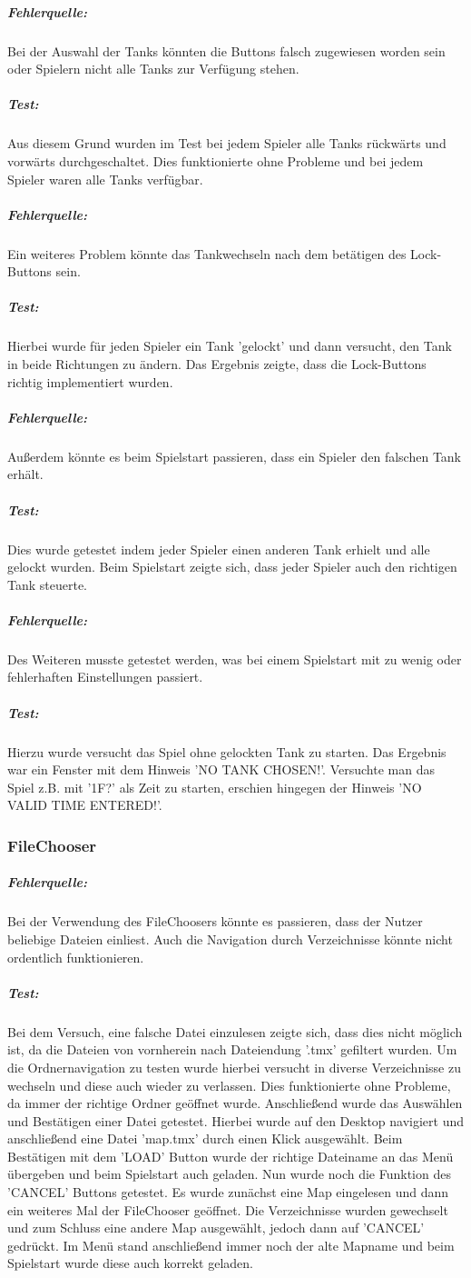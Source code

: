 \documentclass[a4paper]{scrreprt}
\begin{document}
\subparagraph*{Fehlerquelle:}
Bei der Auswahl der Tanks könnten die Buttons falsch zugewiesen worden sein oder Spielern nicht alle Tanks zur Verfügung stehen.
\subparagraph*{Test:}
Aus diesem Grund wurden im Test bei jedem Spieler alle Tanks rückwärts und vorwärts durchgeschaltet. Dies funktionierte ohne Probleme und bei jedem Spieler waren alle Tanks verfügbar. 

\subparagraph*{Fehlerquelle:}
Ein weiteres Problem könnte das Tankwechseln nach dem betätigen des Lock-Buttons sein. 
\subparagraph*{Test:}
Hierbei wurde für jeden Spieler ein Tank 'gelockt' und dann versucht, den Tank in beide Richtungen zu ändern. Das Ergebnis zeigte, dass die Lock-Buttons richtig implementiert wurden.

\subparagraph*{Fehlerquelle:}
Außerdem könnte es beim Spielstart passieren, dass ein Spieler den falschen Tank erhält. 
\subparagraph*{Test:}
Dies wurde getestet indem jeder Spieler einen anderen Tank erhielt und alle gelockt wurden. Beim Spielstart zeigte sich, dass jeder Spieler auch den richtigen Tank steuerte.
		
\subparagraph*{Fehlerquelle:}
Des Weiteren musste getestet werden, was bei einem Spielstart mit zu wenig oder fehlerhaften Einstellungen passiert. 
\subparagraph*{Test:}
Hierzu wurde versucht das Spiel ohne gelockten Tank zu starten. Das Ergebnis war ein Fenster mit dem Hinweis 'NO TANK CHOSEN!'. Versuchte man das Spiel z.B. mit '1F?' als Zeit zu starten, erschien hingegen der Hinweis 'NO VALID TIME ENTERED!'. 

\subsubsection*{FileChooser}
\subparagraph*{Fehlerquelle:}
Bei der Verwendung des FileChoosers könnte es passieren, dass der Nutzer beliebige Dateien einliest. Auch die Navigation durch Verzeichnisse könnte nicht ordentlich funktionieren. 
\subparagraph*{Test:}
Bei dem Versuch, eine falsche Datei einzulesen zeigte sich, dass dies nicht möglich ist, da die Dateien von vornherein nach Dateiendung '.tmx' gefiltert wurden. Um die Ordnernavigation zu testen wurde hierbei versucht in diverse Verzeichnisse zu wechseln und diese auch wieder zu verlassen. Dies funktionierte ohne Probleme, da immer der richtige Ordner geöffnet wurde. Anschließend wurde das Auswählen und Bestätigen einer Datei getestet. Hierbei wurde auf den Desktop navigiert und anschließend eine Datei 'map.tmx' durch einen Klick ausgewählt. Beim Bestätigen mit dem 'LOAD' Button wurde der richtige Dateiname an das Menü übergeben und beim Spielstart auch geladen. Nun wurde noch die Funktion des 'CANCEL' Buttons getestet. Es wurde zunächst eine Map eingelesen und dann ein weiteres Mal der FileChooser geöffnet. Die Verzeichnisse wurden gewechselt und zum Schluss eine andere Map ausgewählt, jedoch dann auf 'CANCEL' gedrückt. Im Menü stand anschließend immer noch der alte Mapname und beim Spielstart wurde diese auch korrekt geladen.
		
\end{document}
